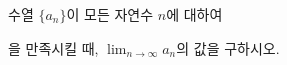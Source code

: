 수열 $\{a_n\}$이 모든 자연수 $n$에 대하여 \par\smallskip{}\par\smallskip\noindent 을 만족시킬 때, $\displaystyle\lim_{n\to\infty} a_n$의 값을 구하시오.
